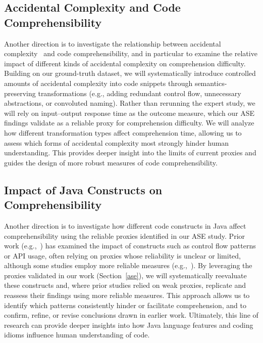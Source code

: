 \subsection{Accidental Complexity and Code Comprehensibility}

Another direction is to investigate the relationship between accidental complexity~\cite{brooks1987no} and code comprehensibility, and in particular to examine the relative impact of different kinds of accidental complexity on comprehension difficulty. Building on our ground-truth dataset, we will systematically introduce controlled amounts of accidental complexity into code snippets through semantics-preserving transformations (e.g., adding redundant control flow, unnecessary abstractions, or convoluted naming). Rather than rerunning the expert study, we will rely on input--output response time as the outcome measure, which our ASE findings validate as a reliable proxy for comprehension difficulty. We will analyze how different transformation types affect comprehension time, allowing us to assess which forms of accidental complexity most strongly hinder human understanding. This provides deeper insight into the limits of current proxies and guides the design of more robust measures of code comprehensibility.

\subsection{Impact of Java Constructs on Comprehensibility}

Another direction is to investigate how different code constructs in Java affect comprehensibility using the reliable proxies identified in our ASE study. Prior work (e.g.,~\cite{lucas2019does}) has examined the impact of constructs such as control flow patterns or API usage, often relying on proxies whose reliability is unclear or limited, although some studies employ more reliable measures (e.g.,~\cite{mehlhorn2022imperative}). By leveraging the proxies validated in our work (Section~\ref{ase}), we will systematically reevaluate these constructs and, where prior studies relied on weak proxies, replicate and reassess their findings using more reliable measures. This approach allows us to identify which patterns consistently hinder or facilitate comprehension, and to confirm, refine, or revise conclusions drawn in earlier work. Ultimately, this line of research can provide deeper insights into how Java language features and coding idioms influence human understanding of code.

